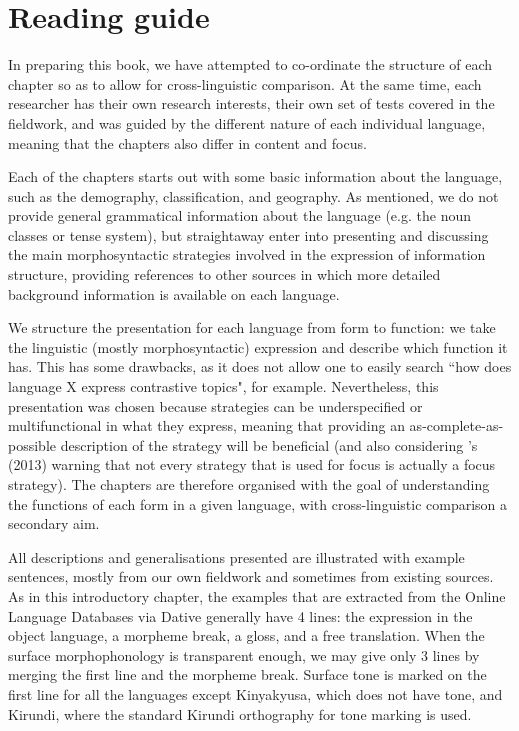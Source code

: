 \documentclass[output=paper]{langscibook}
\begin{document}
\section{Reading guide}
\label{bkm:Ref117846450}
In preparing this book, we have attempted to co-ordinate the structure of each chapter so as to allow for cross-linguistic comparison. At the same time, each researcher has their own research interests, their own set of tests covered in the fieldwork, and was guided by the different nature of each individual language, meaning that the chapters also differ in content and focus.\largerpage

Each of the chapters starts out with some basic information about the language, such as the demography, classification, and geography. As mentioned, we do not provide general grammatical information about the language (e.g. the noun classes or tense system), but straightaway enter into presenting and discussing the main morphosyntactic strategies involved in the expression of information structure, providing references to other sources in which more detailed background information is available on each language.

We structure the presentation for each language from form to function: we take the linguistic (mostly morphosyntactic) expression and describe which function it has. This has some drawbacks, as it does not allow one to easily search ``how does language X express contrastive topics", for example. Nevertheless, this presentation was chosen because strategies can be underspecified or multifunctional in what they express, meaning that providing an as-complete-as-possible description of the strategy will be beneficial (and also considering \citeauthor{MatićWedgwood2013}'s (2013) warning that not every strategy that is used for focus is actually a focus strategy). The chapters are therefore organised with the goal of understanding the functions of each form in a given language, with cross-linguistic comparison a secondary aim.

All descriptions and generalisations presented are illustrated with example sentences, mostly from our own fieldwork and sometimes from existing sources. As in this introductory chapter, the examples that are extracted from the Online Language Databases via Dative generally have 4 lines: the expression in the object language, a morpheme break, a gloss, and a free translation. When the surface morphophonology is transparent enough, we may give only 3 lines by merging the first line and the morpheme break. Surface tone is marked on the first line for all the languages except Kinyakyusa, which does not have tone, and Kirundi, where the standard Kirundi orthography for tone marking is used.
\end{document}
